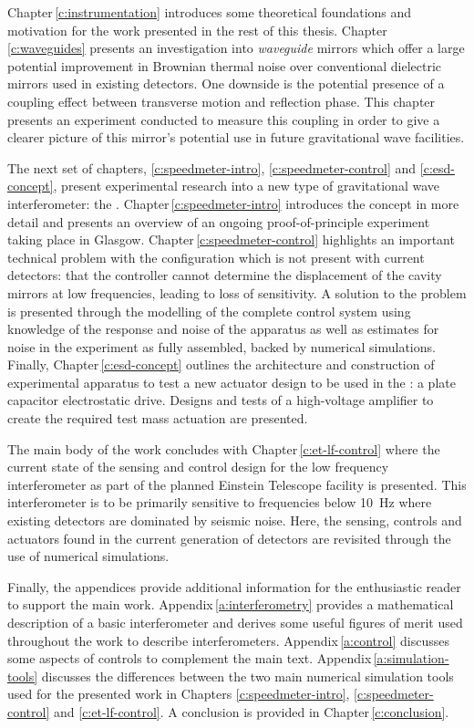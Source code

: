 Chapter\,\ref{c:instrumentation} introduces some theoretical foundations and motivation for the work presented in the rest of this thesis. Chapter\,\ref{c:waveguides} presents an investigation into \emph{waveguide} mirrors which offer a large potential improvement in Brownian thermal noise over conventional dielectric mirrors used in existing detectors. One downside is the potential presence of a coupling effect between transverse motion and reflection phase. This chapter presents an experiment conducted to measure this coupling in order to give a clearer picture of this mirror's potential use in future gravitational wave facilities.

The next set of chapters, \ref{c:speedmeter-intro}, \ref{c:speedmeter-control} and \ref{c:esd-concept}, present experimental research into a new type of gravitational wave interferometer: the \SSM{}. Chapter\,\ref{c:speedmeter-intro} introduces the concept in more detail and presents an overview of an ongoing proof-of-principle experiment taking place in Glasgow. Chapter\,\ref{c:speedmeter-control} highlights an important technical problem with the \SSM{} configuration which is not present with current detectors: that the controller cannot determine the displacement of the cavity mirrors at low frequencies, leading to loss of sensitivity. A solution to the problem is presented through the modelling of the complete control system using knowledge of the response and noise of the apparatus as well as estimates for noise in the experiment as fully assembled, backed by numerical simulations. Finally, Chapter\,\ref{c:esd-concept} outlines the architecture and construction of experimental apparatus to test a new actuator design to be used in the \SSMEXPT{}: a plate capacitor electrostatic drive. Designs and tests of a high-voltage amplifier to create the required test mass actuation are presented.

The main body of the work concludes with Chapter\,\ref{c:et-lf-control} where the current state of the sensing and control design for the low frequency interferometer as part of the planned Einstein Telescope facility is presented. This interferometer is to be primarily sensitive to frequencies below \SI{10}{\hertz} where existing detectors are dominated by seismic noise. Here, the sensing, controls and actuators found in the current generation of detectors are revisited through the use of numerical simulations.

Finally, the appendices provide additional information for the enthusiastic reader to support the main work. Appendix\,\ref{a:interferometry} provides a mathematical description of a basic interferometer and derives some useful figures of merit used throughout the work to describe interferometers. Appendix\,\ref{a:control} discusses some aspects of controls to complement the main text. Appendix\,\ref{a:simulation-tools} discusses the differences between the two main numerical simulation tools used for the presented work in Chapters \ref{c:speedmeter-intro}, \ref{c:speedmeter-control} and \ref{c:et-lf-control}. A conclusion is provided in Chapter\,\ref{c:conclusion}.